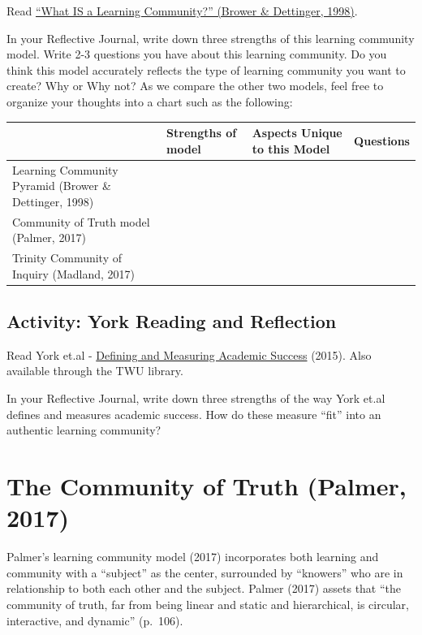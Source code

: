 \documentclass[
]{book}
\begin{document}
\begin{reflect}
Read \href{assets/unit4/Learning_community.pdf}{``What IS a Learning
Community?'' (Brower \& Dettinger, 1998)}.

In your Reflective Journal, write down three strengths of this learning
community model. Write 2-3 questions you have about this learning
community. Do you think this model accurately reflects the type of
learning community you want to create? Why or Why not? As we compare the
other two models, feel free to organize your thoughts into a chart such
as the following:

\begin{longtable}[]{@{}llll@{}}
\toprule
& Strengths of model & Aspects Unique to this Model & Questions \\
\midrule
\endhead
Learning Community Pyramid (Brower \& Dettinger, 1998) & & & \\
Community of Truth model (Palmer, 2017) & & & \\
Trinity Community of Inquiry (Madland, 2017) & & & \\
\bottomrule
\end{longtable}
\end{reflect}

\hypertarget{activity-york-reading-and-reflection}{%
\subsection{Activity: York Reading and Reflection}\label{activity-york-reading-and-reflection}}

\begin{reflect}
Read York et.al - \href{https://eric.ed.gov/?q=EJ1059739}{Defining and
Measuring Academic Success} (2015). Also available through the TWU
library.

In your Reflective Journal, write down three strengths of the way York
et.al defines and measures academic success. How do these measure
``fit'' into an authentic learning community?
\end{reflect}

\hypertarget{the-community-of-truth-palmer-2017}{%
\section{The Community of Truth (Palmer, 2017)}\label{the-community-of-truth-palmer-2017}}

Palmer's learning community model (2017) incorporates both learning and community with a ``subject'' as the center, surrounded by ``knowers'' who are in relationship to both each other and the subject. Palmer (2017) assets that ``the community of truth, far from being linear and static and hierarchical, is circular, interactive, and dynamic'' (p.~106).
\end{document}
